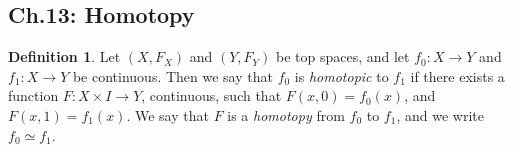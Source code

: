 \documentclass{article}
\theoremstyle{definition}
\newtheorem*{Definition}{Definition}
\begin{document}
\subsection*{Ch.13: Homotopy}

\begin{Definition}
Let $(X,F_X)$ and $(Y,F_Y)$ be top spaces, and let $f_0: X \to Y$ and $f_1:X\to Y$ be continuous. Then we say that $f_0$ is \textit{homotopic} to $f_1$ if there exists a function $F:X\times I \to Y$, continuous, such that $F(x,0)  = f_0 (x)$, and $F(x,1) = f_1(x)$. We say that $F$ is a \textit{homotopy} from $f_0$ to $f_1$, and we write $f_0 \simeq f_1$. 

\end{Definition}
\end{document}
